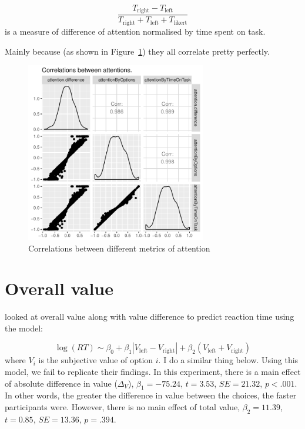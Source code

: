 \documentclass[12pt]{article}
\begin{document}
\begin{equation}
	\frac{T_\text{right}-T_\text{left}}{T_\text{right}+T_\text{left}+T_\text{likert}}
\end{equation}
is a measure of difference of attention normalised by time spent on task. 




Mainly because (as shown in Figure~\ref{figure:attentionCorrelations}) they all correlate pretty perfectly. 

\begin{figure}
	\centering
	\includegraphics[width=0.7\textwidth]{images/attentionCorrelations}
	\caption{Correlations between different metrics of attention}
	\label{figure:attentionCorrelations}
\end{figure}

\clearpage
\section{Overall value}

 looked at overall value along with value difference to predict reaction time using the model:

\begin{equation}
	\log(RT) \sim \beta_0 + \beta_1|V_\text{left} - V_\text{right}| + \beta_2(V_\text{left} + V_\text{right})
\end{equation}
where $V_i$ is the subjective value of option $i$. I do a similar thing below. Using this model, we fail to replicate their findings. In this experiment, there is a main effect of absolute difference in value ($\Delta_V$), $\beta_1=-75.24$, $t=3.53$, $SE=21.32$, $p<.001$. In other words, the greater the difference in value between the choices, the faster participants were. However, there is no main effect of total value, $\beta_2=11.39$, $t=0.85$, $SE=13.36$, $p=.394$.
\end{document}
